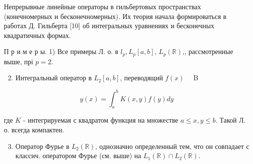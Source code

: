 \documentclass[10pt]{article}
\begin{document}
Непрерывные линейные операторы в гильбертовых пространствах (конечномерных и бесконечномерных). Их теория начала формироваться в работах Д. Гильберта [10] об интегральных уравнениях и бесконечных квадратичных формах.



П р и м е р ы. 1) Все примеры Л. о. в $l_{p}, L_{p}[a, b]$, $L_{p}(\mathbb{R})$,, рассмотренные выше, прі $p=2$.



\begin{enumerate}

  \setcounter{enumi}{1}

  \item Интегральный оператор в $L_{2}[a, b]$, переводящий $f(x) \quad$ B

\end{enumerate}



\[

y(x)=\int_{a}^{b} K(x, y) f(y) d y

\]



где $K$ - интегрируемая с квадратом функция на множестве $a \leqslant x, y \leqslant b$. Такой Л. о. всегда компактен.



\begin{enumerate}

  \setcounter{enumi}{2}

  \item Оператор Фурье в $L_{2}(\mathbb{R})$, однозначно определенный тем, что он совпадает с классич. оператором Фурье (см. выше) на $L_{1}(\mathbb{R}) \cap L_{2}(\mathbb{R})$.

\end{enumerate}
\end{document}
